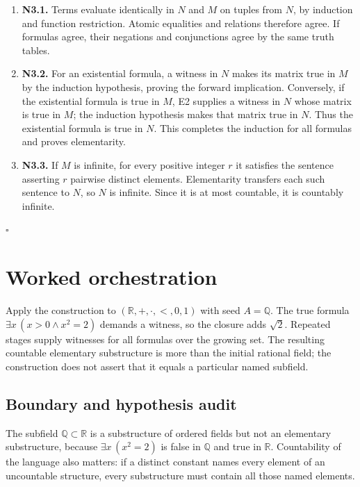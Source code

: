 \documentclass[preprint,12pt,aps,pra,showkeys,amsmath,amssymb,superscriptaddress,floatfix]{revtex4-2}
\theoremstyle{definition}
\theoremstyle{remark}
\begin{document}
\begin{enumerate}
\def\labelenumi{\arabic{enumi}.}
\item
  \textbf{N3.1.} Terms evaluate identically in \(N\) and \(M\) on tuples
  from \(N\), by induction and function restriction. Atomic equalities
  and relations therefore agree. If formulas agree, their negations and
  conjunctions agree by the same truth tables.
\item
  \textbf{N3.2.} For an existential formula, a witness in \(N\) makes
  its matrix true in \(M\) by the induction hypothesis, proving the
  forward implication. Conversely, if the existential formula is true in
  \(M\), E2 supplies a witness in \(N\) whose matrix is true in \(M\);
  the induction hypothesis makes that matrix true in \(N\). Thus the
  existential formula is true in \(N\). This completes the induction for
  all formulas and proves elementarity.
\item
  \textbf{N3.3.} If \(M\) is infinite, for every positive integer \(r\)
  it satisfies the sentence asserting \(r\) pairwise distinct elements.
  Elementarity transfers each such sentence to \(N\), so \(N\) is
  infinite. Since it is at most countable, it is countably infinite.
\end{enumerate}

\hfill$\square$

\section{Worked orchestration}

Apply the construction to \((\mathbb R,+,\cdot,<,0,1)\) with seed
\(A=\mathbb Q\). The true formula \(\exists x\,(x>0\wedge x^2=2)\)
demands a witness, so the closure adds \(\sqrt2\). Repeated stages
supply witnesses for all formulas over the growing set. The resulting
countable elementary substructure is more than the initial rational
field; the construction does not assert that it equals a particular
named subfield.

\subsection{Boundary and hypothesis audit}

The subfield \(\mathbb Q\subset\mathbb R\) is a substructure of ordered
fields but not an elementary substructure, because
\(\exists x\,(x^2=2)\) is false in \(\mathbb Q\) and true in
\(\mathbb R\). Countability of the language also matters: if a distinct
constant names every element of an uncountable structure, every
substructure must contain all those named elements.
\end{document}
